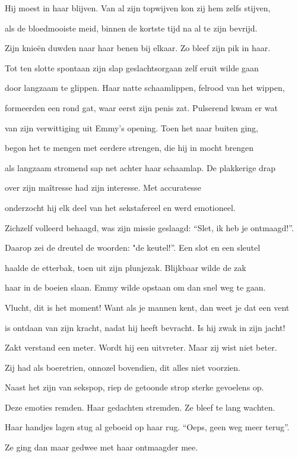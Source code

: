 Hij moest in haar blijven.
Van al zijn topwijven
kon zij hem zelfs stijven,

als de bloedmooiste meid,
binnen de kortste tijd
na al te zijn bevrijd.

Zijn knieën duwden naar
haar benen bij elkaar.
Zo bleef zijn pik in haar.

Tot ten slotte spontaan
zijn slap geslachtsorgaan
zelf eruit wilde gaan

door langzaam te glippen.
Haar natte schaamlippen,
felrood van het wippen,

formeerden een rond gat,
waar eerst zijn penis zat.
Pulserend kwam er wat

van zijn verwittiging
uit Emmy’s opening.
Toen het naar buiten ging,

begon het te mengen
met eerdere strengen,
die hij in mocht brengen

als langzaam stromend sap
net achter haar schaamlap.
De plakkerige drap

over zijn maîtresse
had zijn interesse.
Met accuratesse

onderzocht hij elk deel
van het sekstafereel
en werd emotioneel.

Zichzelf volleerd behaagd,
was zijn missie geslaagd:
“Slet, ik heb je ontmaagd!”.

Daarop zei de dreutel
de woorden: "de keutel!”.
Een slot en een sleutel

haalde de etterbak,
toen uit zijn plunjezak.
Blijkbaar wilde de zak

haar in de boeien slaan.
Emmy wilde opstaan
om dan snel weg te gaan.

Vlucht, dit is het moment!
Want als je mannen kent,
dan weet je dat een vent

is ontdaan van zijn kracht,
nadat hij heeft bevracht.
Is hij zwak in zijn jacht!

Zakt verstand een meter. Wordt hij een uitvreter.
Maar zij wist niet beter.

Zij had als boeretrien,
onnozel bovendien,
dit alles niet voorzien.

Naast het zijn van sekspop,
riep de getoonde strop
sterke gevoelens op.

Deze emoties remden.
Haar gedachten stremden.
Ze bleef te lang wachten.

Haar handjes lagen stug
al geboeid op haar rug.
“Oeps, geen weg meer terug”.

Ze ging dan maar gedwee
met haar ontmaagder mee.
